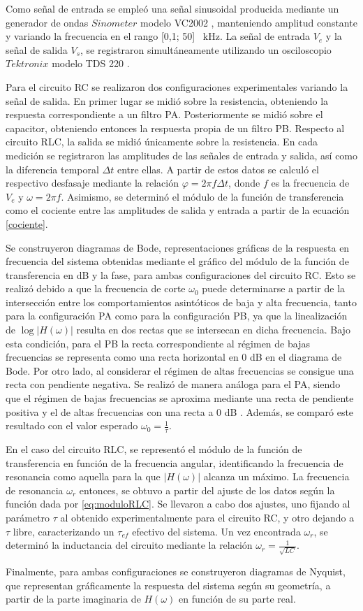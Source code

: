 Como señal de entrada se empleó una señal sinusoidal producida mediante un generador de ondas $Sinometer$ modelo VC2002 \cite{VC2002}, manteniendo amplitud constante y variando la frecuencia en el rango [0,1; 50] \SI{}{\kilo\hertz}. La señal de entrada $V_e$ y la señal de salida $V_s$, se registraron simultáneamente utilizando un osciloscopio $Tektronix$ modelo TDS 220 \cite{TDS200}. 

Para el circuito RC se realizaron dos configuraciones experimentales variando la señal de salida. En primer lugar se midió sobre la resistencia, obteniendo la respuesta correspondiente a un filtro PA. Posteriormente se midió sobre el capacitor, obteniendo entonces la respuesta propia de un filtro PB. Respecto al circuito RLC, la salida se midió únicamente sobre la resistencia. En cada medición se registraron las amplitudes de las señales de entrada y salida, así como la diferencia temporal $\Delta t$ entre ellas. A partir de estos datos se calculó el respectivo desfasaje mediante la relación $\varphi=2\pi f \Delta t$, donde $f$ es la frecuencia de $V_e$ y $\omega=2\pi f$. Asimismo, se determinó el módulo de la función de transferencia como el cociente entre las amplitudes de salida y entrada a partir de la ecuación \eqref{cociente}. 

Se construyeron diagramas de Bode, representaciones gráficas de la respuesta en frecuencia del sistema obtenidas mediante el gráfico del módulo de la función de transferencia en dB y la fase, para ambas configuraciones del circuito RC. Esto se realizó debido a que la frecuencia de corte $\omega_0$ puede determinarse a partir de la intersección entre los comportamientos asintóticos de baja y alta frecuencia, tanto para la configuración PA como para la configuración PB, ya que la linealización de $\log\left| H(\omega) \right|$ resulta en dos rectas que se intersecan en dicha frecuencia. Bajo esta condición, para el PB  la recta correspondiente al régimen de bajas frecuencias se representa como una recta horizontal en 0 dB en el diagrama de Bode. Por otro lado, al
considerar el régimen de altas frecuencias se consigue una recta con pendiente negativa. Se realizó de manera análoga para el PA, siendo que el régimen de bajas frecuencias se aproxima mediante una recta de pendiente positiva y el de altas frecuencias con una recta a 0 dB . Además, se comparó este resultado con el valor esperado \(\omega_0 = \frac{1}{\tau}\). 

En el caso del circuito RLC, se representó el módulo de la función de transferencia en función de la frecuencia angular, identificando la frecuencia de resonancia como aquella para la que $\left| H(\omega) \right|$  alcanza un máximo. La frecuencia de resonancia $\omega_r$ entonces, se obtuvo a partir del ajuste de los datos según la función dada por \eqref{eq:moduloRLC}. Se llevaron a cabo dos ajustes, uno fijando al parámetro $\tau$ al obtenido experimentalmente para el circuito RC, y otro dejando a $\tau$ libre, caracterizando un $\tau_{ef}$ efectivo del sistema. Un vez encontrada $\omega_r$, se determinó la inductancia del circuito mediante la relación $\omega_r=\frac{1}{\sqrt{LC}}$. 

Finalmente, para ambas configuraciones se construyeron diagramas de Nyquist, que representan gráficamente la respuesta del sistema según su geometría, a partir de  la parte imaginaria de $H(\omega)$ en función de su parte real. 

